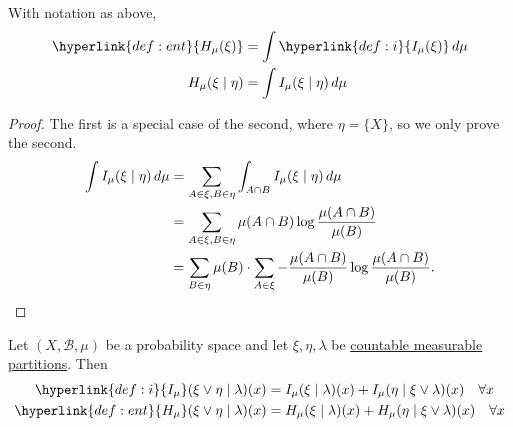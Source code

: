 \documentclass{article}
\newcommand{\named}[1]{\textbf{#1}\index{#1}}
\begin{document}
\begin{lemma}
  With notation as above,
  \begin{align*}
    \hyperlink{def:ent}{H_\mu(\xi)} &= \int \hyperlink{def:i}{I_\mu(\xi)}\,d\mu \\
    H_\mu(\xi \mid \eta) &= \int I_\mu(\xi \mid \eta)\,d\mu
  \end{align*}
\end{lemma}
\begin{proof}
  The first is a special case of the second, where $\eta = \{X\}$, so we only prove the second.
  \begin{align*}
    \int I_\mu(\xi \mid \eta)\,d\mu &= \sum_{A \in \xi, B \in \eta} \int_{A\cap B} I_\mu(\xi\mid\eta)\,d\mu \\
                                    &= \sum_{A\in\xi, B\in\eta} \mu(A\cap B) \log{\frac{\mu(A \cap B)}{\mu(B)}} \\
                                    &= \sum_{B\in\eta} \mu(B) \cdot \sum_{A\in\xi}-\frac{\mu(A\cap B)}{\mu(B)} \log\frac{\mu(A \cap B)}{\mu(B)}\qedhere.
  \end{align*}
\end{proof}
\begin{lemma}
  Let $(X,\mathcal{B},\mu)$ be a probability space and let $\xi,\eta,\lambda$ be \hyperlink{def:partition}{countable measurable partitions}. Then
  \begin{align*}
    \hyperlink{def:i}{I_\mu}(\xi \vee \eta \mid \lambda)(x) &= I_\mu(\xi \mid \lambda) (x) + I_\mu(\eta \mid \xi \vee \lambda)(x) \quad \forall x \\
    \hyperlink{def:ent}{H_\mu}(\xi \vee \eta \mid \lambda)(x) &= H_\mu(\xi \mid \lambda) (x) + H_\mu(\eta \mid \xi \vee \lambda)(x) \quad \forall x
  \end{align*}
\end{lemma}
\end{document}
